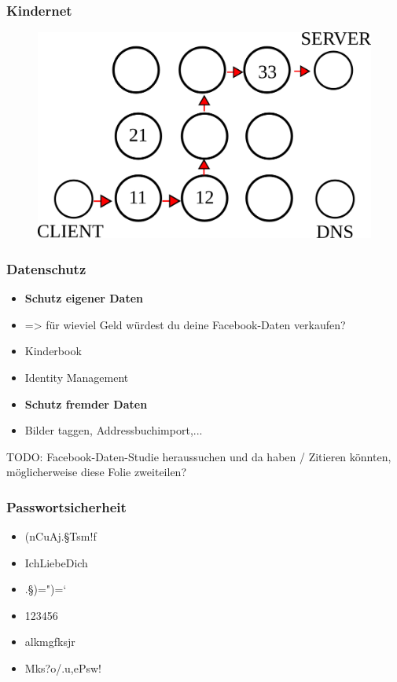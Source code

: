 \documentclass[12pt]{beamer}
\begin{document}
\begin{frame}
  \frametitle{Kindernet}
  \begin{figure}
    \includegraphics[height=0.7\textheight]{img/kindernet.png}
  \end{figure}
\end{frame}

\begin{frame}
  \frametitle{Datenschutz}
  \begin{itemize}
    \item \textbf{Schutz eigener Daten}
    \item => für wieviel Geld würdest du deine Facebook-Daten verkaufen?
    \item Kinderbook
    \item Identity Management
    \item \textbf{Schutz fremder Daten}
    \item Bilder taggen, Addressbuchimport,...
  \end{itemize}
  TODO: Facebook-Daten-Studie heraussuchen und da haben / Zitieren könnten, möglicherweise diese Folie zweiteilen?
\end{frame}

\begin{frame}
  \frametitle{Passwortsicherheit}
  \begin{itemize}
    \item (nCuAj.§Tsm!f
    \item IchLiebeDich
    \item .§)=")=`
    \item 123456
    \item alkmgfksjr
    \item Mks?o/.u,ePsw!
  \end{itemize}
\end{frame}
\end{document}
